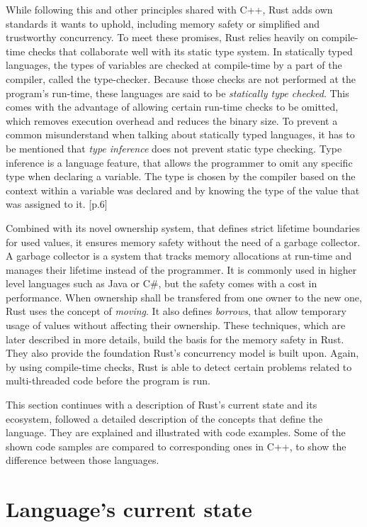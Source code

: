 While following this and other principles shared with C++, Rust adds own standards it wants to uphold, including memory safety or simplified and trustworthy concurrency. To meet these promises, Rust relies heavily on compile-time checks that collaborate well with its static type system. 
In statically typed languages, the types of variables are checked at compile-time by a part of the compiler, called the type-checker. Because those checks are not performed at the program's run-time, these languages are said to be \textit{statically type checked}. This comes with the advantage of allowing certain run-time checks to be omitted, which removes execution overhead and reduces the binary size. To prevent a common misunderstand when talking about statically typed languages, it has to be mentioned that \textit{type inference} does not prevent static type checking. Type inference is a language feature, that allows the programmer to omit any specific type when declaring a variable. The type is chosen by the compiler based on the context within a variable was declared and by knowing the type of the value that was assigned to it. \cite{TypeInf}[p.6] 

Combined with its novel ownership system, that defines strict lifetime boundaries for used values, it ensures memory safety without the need of a garbage collector. A garbage collector is a system that tracks memory allocations at run-time and manages their lifetime instead of the programmer. It is commonly used in higher level languages such as Java or C\#, but the safety comes with a cost in performance. When ownership shall be transfered from one owner to the new one, Rust uses the concept of \textit{moving}. It also defines \textit{borrows}, that allow temporary usage of values without affecting their ownership. These techniques, which are later described in more details, build the basis for the memory safety in Rust. They also provide the foundation Rust's concurrency model is built upon. Again, by using compile-time checks, Rust is able to detect certain problems related to multi-threaded code before the program is run. 

This section continues with a description of Rust's current state and its ecosystem, followed a detailed description of the concepts that define the language. They are explained and illustrated with code examples. Some of the shown code samples are compared to corresponding ones in C++, to show the difference between those languages.

\section{Language's current state}

